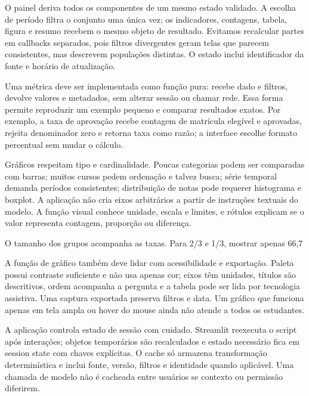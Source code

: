 O painel deriva todos os componentes de um mesmo estado validado. A escolha de período filtra o conjunto uma única vez; os indicadores, contagens, tabela, figura e resumo recebem o mesmo objeto de resultado. Evitamos recalcular partes em callbacks separados, pois filtros divergentes geram telas que parecem consistentes, mas descrevem populações distintas. O estado inclui identificador da fonte e horário de atualização.

Uma métrica deve ser implementada como função pura: recebe dado e filtros, devolve valores e metadados, sem alterar sessão ou chamar rede. Essa forma permite reproduzir um exemplo pequeno e comparar resultados exatos. Por exemplo, a taxa de aprovação recebe contagem de matrícula elegível e aprovadas, rejeita denominador zero e retorna taxa como razão; a interface escolhe formato percentual sem mudar o cálculo.

Gráficos respeitam tipo e cardinalidade. Poucas categorias podem ser comparadas com barras; muitos cursos pedem ordenação e talvez busca; série temporal demanda períodos consistentes; distribuição de notas pode requerer histograma e boxplot. A aplicação não cria eixos arbitrários a partir de instruções textuais do modelo. A função visual conhece unidade, escala e limites, e rótulos explicam se o valor representa contagem, proporção ou diferença.

O tamanho dos grupos acompanha as taxas. Para 2/3 e 1/3, mostrar apenas 66,7%

A função de gráfico também deve lidar com acessibilidade e exportação. Paleta possui contraste suficiente e não usa apenas cor; eixos têm unidades, títulos são descritivos, ordem acompanha a pergunta e a tabela pode ser lida por tecnologia assistiva. Uma captura exportada preserva filtros e data. Um gráfico que funciona apenas em tela ampla ou hover do mouse ainda não atende a todos os estudantes.

A aplicação controla estado de sessão com cuidado. Streamlit reexecuta o script após interações; objetos temporários são recalculados e estado necessário fica em session state com chaves explícitas. O cache só armazena transformação determinística e inclui fonte, versão, filtros e identidade quando aplicável. Uma chamada de modelo não é cacheada entre usuários se contexto ou permissão diferirem.

